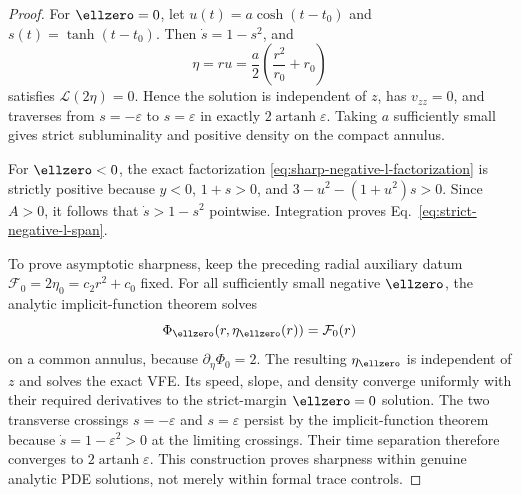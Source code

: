 \begin{proof}
For $\ellzero=0$, let
$u(t)=a\cosh(t-t_0)$ and $s(t)=\tanh(t-t_0)$. Then
$\dot s=1-s^2$, and
$$
\eta=ru=\frac a2\left(\frac{r^2}{r_0}+r_0\right)
$$
satisfies $\mathcal L(2\eta)=0$. Hence the solution is independent of
$z$, has $v_{zz}=0$, and traverses from $s=-\varepsilon$ to
$s=\varepsilon$ in exactly
$2\operatorname{artanh}\varepsilon$. Taking $a$ sufficiently small gives
strict subluminality and positive density on the compact annulus.

For $\ellzero<0$, the exact factorization
\eqref{eq:sharp-negative-l-factorization} is strictly positive because
$y<0$, $1+s>0$, and
$3-u^2-(1+u^2)s>0$. Since $A>0$, it follows that
$\dot s>1-s^2$ pointwise. Integration proves
Eq.~\eqref{eq:strict-negative-l-span}.

To prove asymptotic sharpness, keep the preceding radial auxiliary datum
$\mathcal F_0=2\eta_0=c_2r^2+c_0$ fixed. For all sufficiently small
negative $\ellzero$, the analytic implicit-function theorem solves
$$
\Phi_{\ellzero}(r,\eta_{\ellzero}(r))=\mathcal F_0(r)
$$
on a common annulus, because
$\partial_\eta\Phi_0=2$. The resulting $\eta_{\ellzero}$ is independent
of $z$ and solves the exact VFE. Its speed, slope, and density converge
uniformly with their required derivatives to the strict-margin
$\ellzero=0$ solution. The two transverse crossings
$s=-\varepsilon$ and $s=\varepsilon$ persist by the implicit-function
theorem because $\dot s=1-\varepsilon^2>0$ at the limiting crossings.
Their time separation therefore converges to
$2\operatorname{artanh}\varepsilon$. This construction proves sharpness
within genuine analytic PDE solutions, not merely within formal trace
controls.
\end{proof}

